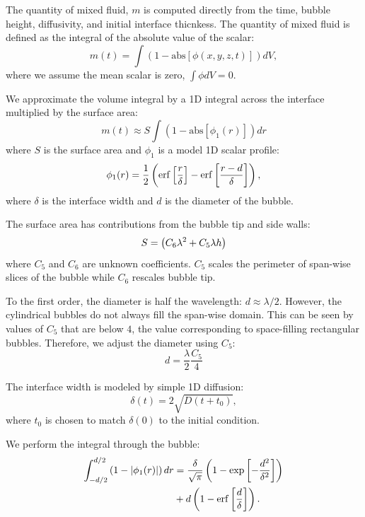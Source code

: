 The quantity of mixed fluid, $m$ is computed directly from the time, bubble height, diffusivity, and initial interface thicnkess.
The quantity of mixed fluid is defined as the integral of the absolute value of the scalar:
\begin{equation}
	m(t) = \int \left( 1-\text{abs}\left[\phi(x,y,z,t)\right] \right) dV,
\end{equation}
where we assume the mean scalar is zero, $\int \phi dV = 0$.

We approximate the volume integral by a 1D integral across the interface multiplied by the surface area:
\begin{equation}
	m(t) \approx S \int \left( 1- \text{abs}\left[\phi_1(r)\right] \right) dr
\end{equation}
where $S$ is the surface area and
$\phi_1$ is a model 1D scalar profile:
\begin{equation}
\phi_1(r) = \frac{1}{2} \left( \operatorname{erf}\left[\frac{r}{\delta}\right] - \operatorname{erf}\left[\frac{r - d}{\delta}\right] \right),
\end{equation}
where $\delta$ is the interface width and
$d$ is the diameter of the bubble.

The surface area has contributions from the bubble tip and side walls:
\begin{equation} \elabel{surface_area}
S = \left(C_6 \lambda^2 + C_5 \lambda h\right)
\end{equation}
where $C_5$ and $C_6$ are unknown coefficients.
$C_5$ scales the perimeter of span-wise slices of the bubble while $C_6$ rescales bubble tip.

To the first order, the diameter is half the wavelength: $d \approx \lambda / 2$.
However, the cylindrical bubbles do not always fill the span-wise domain.
This can be seen by values of $C_5$ that are below $4$, the value corresponding to space-filling rectangular bubbles.
Therefore, we adjust the diameter using $C_5$:
\begin{equation}
d = \frac{\lambda}{2} \frac{C_5}{4}
\end{equation}

The interface width is modeled by simple 1D diffusion:
\begin{equation}
\delta(t) = 2 \sqrt{D (t + t_0)},
\end{equation}
where $t_0$ is chosen to match $\delta(0)$ to the initial condition.

We perform the integral through the bubble:
\begin{equation} \elabel{profile1d}
\begin{split}
	\int_{-d/2}^{d/2} \left(1- \left|\phi_1(r)\right| \right) dr &= \frac{\delta}{\sqrt{\pi}} \left( 1 - \exp\left[-\frac{d^2}{\delta^2}\right]\right) \\
&+ d \left(1 - \erf\left[\frac{d}{\delta}\right]\right).
\end{split}
\end{equation}

